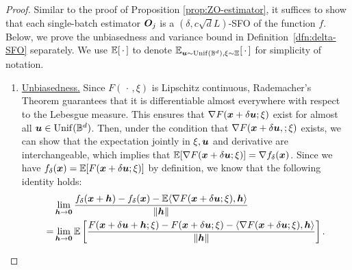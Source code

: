 \propfoest*
\begin{proof}
	Similar to the proof of Proposition \ref{prop:ZO-estimator}, it suffices to show that each single-batch estimator ${\bm{O}}_j$ is a $(\delta, c \sqrt{d} L)$-SFO of the function $f$. Below, we prove the unbiasedness and variance bound in Definition~\ref{dfn:delta-SFO} separately.
	We use $\mathbb{E}[\,\cdot\,]$ to denote $\mathbb{E}_{{\bm{u}} \sim {\rm Unif}({\mathbb{B}}^d), \xi \sim \Xi}[\,\cdot\,]$ for simplicity of notation.
	\begin{enumerate}
		\item \underline{Unbiasedness.}
		Since $F(\,\cdot\,,\xi)$ is Lipschitz continuous, Rademacher's Theorem guarantees that it is differentiable almost everywhere with respect to the Lebesgue measure. This ensures that $\nabla F({\bm{x}}+ \delta {\bm{u}}; \xi)$ exist for almost all ${\bm{u}} \in {\rm Unif}({\mathbb{B}}^d)$.
		Then, under the condition that $\nabla F({\bm{x}}+\delta {\bm{u}},;\xi)$ exists, we can show that the expectation jointly in $\xi, {\bm{u}}$ and derivative are interchangeable, which implies that $ \mathbb{E} [\nabla F({\bm{x}}+ \delta {\bm{u}};\xi)] = \nabla f_\delta({\bm{x}})$.
		Since we have $f_\delta({\bm{x}}) = \mathbb{E}[F({\bm{x}}+\delta{\bm{u}};\xi)]$ by definition, we know that the following identity holds:
		\begin{align} \label{eq:lim-grad}
			\begin{split}
				&\lim_{{\bm{h}} \rightarrow {\bm{0}}} \frac{f_\delta({\bm{x}}+{\bm{h}}) - f_\delta({\bm{x}}) - \mathbb{E}\langle \nabla F({\bm{x}}+\delta {\bm{u}};\xi), {\bm{h}} \rangle  }{\Vert {\bm{h}} \Vert} \\
				=& \lim_{{\bm{h}} \rightarrow {\bm{0}}} \mathbb{E}\left[ \frac{F({\bm{x}}+\delta{\bm{u}}+ {\bm{h}}; \xi) - F({\bm{x}}+\delta {\bm{u}}; \xi) - \langle \nabla F({\bm{x}}+\delta {\bm{u}};\xi), {\bm{h}} \rangle  }{\Vert {\bm{h}} \Vert} \right].    
			\end{split}
		\end{align}

\end{enumerate}
\end{proof}
